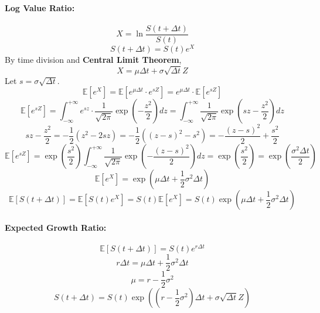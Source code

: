 \documentclass{article}
\begin{document}
\paragraph{Log Value Ratio:}
\[
    X = \ln \frac{S(t+\Delta t)}{S(t)}
\]
\[
    S(t+\Delta t) = S(t) e^X
\]
By time division and \textbf{Central Limit Theorem},
\[
    X = \mu \Delta t + \sigma \sqrt{\Delta t} Z
\]
Let $s = \sigma \sqrt{\Delta t}$.
\[
    \mathbb{E}[e^X] = \mathbb{E}[e^{\mu \Delta t} \cdot e^{sZ}] = e^{\mu \Delta t} \cdot \mathbb{E}[e^{sZ}]
\]
\[
    \mathbb{E}[e^{sZ}] = \int_{-\infty}^{+\infty} e^{sz} \cdot \frac{1}{\sqrt{2\pi}} \exp\left( -\frac{z^2}{2} \right) dz = \int_{-\infty}^{+\infty} \frac{1}{\sqrt{2\pi}} \exp\left( sz - \frac{z^2}{2} \right) dz
\]
\[
    sz - \frac{z^2}{2} = -\frac{1}{2}(z^2 - 2sz) = -\frac{1}{2}((z-s)^2 - s^2) = -\frac{(z-s)^2}{2} + \frac{s^2}{2}
\]
\[
    \mathbb{E}[e^{sZ}] = \exp\left( \frac{s^2}{2} \right) \int_{-\infty}^{+\infty} \frac{1}{\sqrt{2\pi}} \exp\left( -\frac{(z-s)^2}{2} \right) dz = \exp\left( \frac{s^2}{2} \right) = \exp\left( \frac{\sigma^2 \Delta t}{2} \right)
\]
\[
    \mathbb{E}[e^X] = \exp\left( \mu \Delta t + \frac{1}{2} \sigma^2 \Delta t \right)
\]
\[
    \mathbb{E}[S(t+\Delta t)] = \mathbb{E}[S(t) e^X] = S(t) \mathbb{E}[e^X] = S(t) \exp\left( \mu \Delta t + \frac{1}{2} \sigma^2 \Delta t \right)
\]
\paragraph{Expected Growth Ratio:}
\[
    \mathbb{E}[S(t+\Delta t)] = S(t) e^{r \Delta t}
\]
\[
    r \Delta t = \mu \Delta t + \frac{1}{2} \sigma^2 \Delta t
\]
\[
    \mu = r - \frac{1}{2} \sigma^2
\]
\[
    S(t+\Delta t) = S(t) \exp\left( \left( r - \frac{1}{2} \sigma^2 \right) \Delta t + \sigma \sqrt{\Delta t} Z \right)
\]
\end{document}
